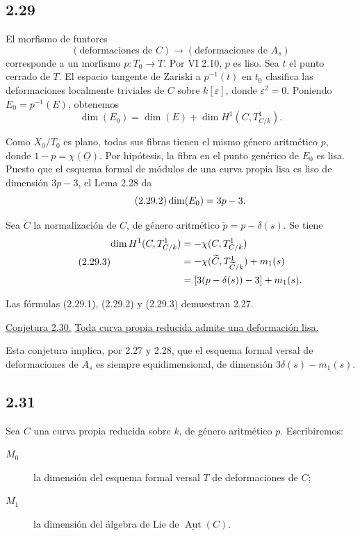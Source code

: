 \subsection*{2.29}
El morfismo de funtores
\begin{equation*}
(\text{deformaciones de }C)\longrightarrow
(\text{deformaciones de }A_s)
\end{equation*}
corresponde a un morfismo $p:T_0\longrightarrow T$. Por VI 2.10, $p$ es liso.
Sea $t$ el punto cerrado de $T$. El espacio tangente de Zariski a $p^{-1}(t)$
en $t_0$ clasifica las deformaciones localmente triviales de $C$ sobre
$k[\varepsilon]$, donde $\varepsilon^2=0$. Poniendo $E_0=p^{-1}(E)$, obtenemos
\begin{equation}\tag{2.29.1}
\dim(E_0)=\dim(E)+\dim H^1(C,T^1_{C/k}).
\end{equation}

Como $X_0/T_0$ es plano, todas sus fibras tienen el mismo género aritmético
$p$, donde $1-p=\chi(\underline O)$. Por hipótesis, la fibra en el punto
genérico de $E_0$ es lisa. Puesto que el esquema formal de módulos de una curva
propia lisa es liso de dimensión $3p-3$, el Lema 2.28 da
\begin{equation}\tag{2.29.2}
\dim(\sisi{E}{E_0})=3p-3.
\end{equation}

Sea $\widetilde C$ la normalización de $C$, de género aritmético
$\widetilde p=p-\delta(s)$. Se tiene
\begin{equation}\tag{2.29.3}
\begin{aligned}
\dim H^1(C,T^1_{C/k})
&=-\chi(C,T^1_{C/k})\\
&=-\chi(\widetilde C,T^1_{\widetilde C/k})+m_1(s)\\
&=\sisi{-}{}[3(p-\delta(s))-3]+m_1(s).
\end{aligned}
\end{equation}

Las fórmulas (2.29.1), (2.29.2) y (2.29.3) demuestran 2.27.

\medskip
\noindent\underline{Conjetura 2.30.}
\underline{Toda curva propia reducida admite una deformación lisa.}

Esta conjetura implica, por 2.27 y 2.28, que el esquema formal versal de
deformaciones de $A_s$ es siempre equidimensional, de dimensión
$3\delta(s)-m_1(s)$.

\pageoriginale

\subsection*{2.31}
Sea $C$ una curva propia reducida sobre $k$, de género aritmético $p$.
Escribiremos:
\begin{description}
\item[$M_0$] la dimensión del esquema formal versal $T$ de deformaciones de
$C$;
\item[$M_1$] la dimensión del álgebra de Lie de
$\underline{\operatorname{Aut}}(C)$.
\end{description}

